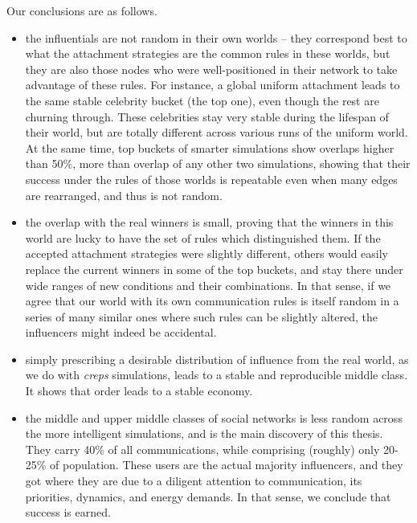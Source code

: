 \documentclass[10pt,oneside]{memoir}
\begin{document}
Our conclusions are as follows.


\begin{itemize}


\item the influentials are not random in their own worlds -- they correspond best to what the attachment strategies are the common rules in these worlds, but they are also those nodes who were well-positioned in their network to take advantage of these rules.  For instance, a global uniform attachment leads to the same stable celebrity bucket (the top one), even though the rest are churning through.  These celebrities stay very stable during the lifespan of their world, but are totally different across various runs of the uniform world.  At the same time, top buckets of smarter simulations show overlaps higher than 50\%, more than overlap of any other two simulations, showing that their success under the rules of those worlds is repeatable even when many edges are rearranged, and thus is not random.




\item the overlap with the real winners is small, proving that the winners in this world are lucky to have the set of rules which distinguished them.  If the accepted attachment strategies were slightly different, others would easily replace the current winners in some of the top buckets, and stay there under wide ranges of new conditions and their combinations.  In that sense, if we agree that our world with its own communication rules is itself random in a series of many similar ones where such rules can be slightly altered, the influencers might indeed be accidental. 




\item simply prescribing a desirable distribution of influence from the real world, as we do with {\itshape creps} simulations, leads to a stable and reproducible middle class.  It shows that order leads to a stable economy.




\item the middle and upper middle classes of social networks is less random across the more intelligent simulations, and is the main discovery of this thesis.  They carry 40\% of all communications, while comprising (roughly) only 20-25\% of population.  These users are the actual majority influencers, and they got where they are due to a diligent attention to communication, its priorities, dynamics, and energy demands.  In that sense, we conclude that success is earned.





\end{itemize}
\end{document}

